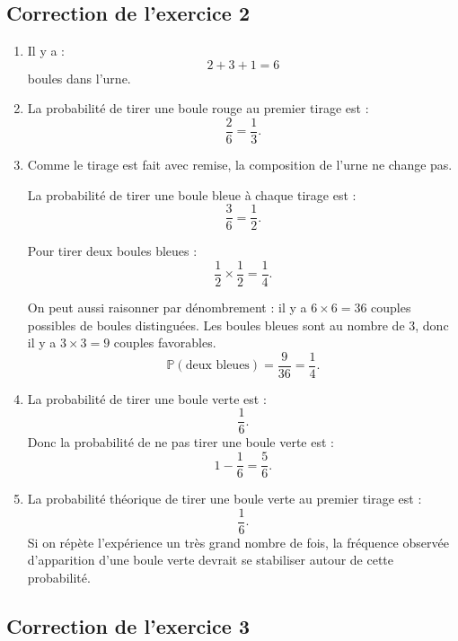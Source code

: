 \documentclass[11pt,a4paper]{article}
\newcommand{\Prob}{\mathbb{P}}
\begin{document}
\subsection*{Correction de l'exercice 2}

\begin{enumerate}
    \item Il y a :
    \[
    2+3+1=6
    \]
    boules dans l'urne.
    
    \item La probabilité de tirer une boule rouge au premier tirage est :
    \[
    \frac{2}{6}=\frac{1}{3}.
    \]
    
    \item Comme le tirage est fait avec remise, la composition de l'urne ne change pas.
    
    La probabilité de tirer une boule bleue à chaque tirage est :
    \[
    \frac{3}{6}=\frac{1}{2}.
    \]
    
    Pour tirer deux boules bleues :
    \[
    \frac{1}{2}\times \frac{1}{2}=\frac{1}{4}.
    \]
    
    On peut aussi raisonner par dénombrement : il y a $6\times 6=36$ couples possibles de boules distinguées. Les boules bleues sont au nombre de $3$, donc il y a $3\times 3=9$ couples favorables.
    \[
    \Prob(\text{deux bleues})=\frac{9}{36}=\frac{1}{4}.
    \]
    
    \item La probabilité de tirer une boule verte est :
    \[
    \frac{1}{6}.
    \]
    Donc la probabilité de ne pas tirer une boule verte est :
    \[
    1-\frac{1}{6}=\frac{5}{6}.
    \]
    
    \item La probabilité théorique de tirer une boule verte au premier tirage est :
    \[
    \frac{1}{6}.
    \]
    Si on répète l'expérience un très grand nombre de fois, la fréquence observée d'apparition d'une boule verte devrait se stabiliser autour de cette probabilité.
\end{enumerate}

\subsection*{Correction de l'exercice 3}
\end{document}

